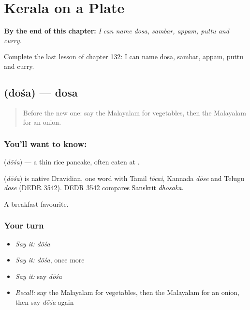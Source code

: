 
\chapter{Kerala on a Plate}
\label{ch:ml-kerala-on-a-plate}

\begin{chapteropening}
\textbf{By the end of this chapter:} \emph{I can name dosa, sambar, appam, puttu and curry.}

Complete the last lesson of chapter 132: I can name dosa, sambar, appam, puttu and curry.
\end{chapteropening}

\section[\texorpdfstring{\ml{ദോശ} (dōśa)}{ദോശ (dōśa)}]{ (dōśa) — dosa}

\label{lesson:ML-C132-dosa}



\begin{quote}
Before the new one: say the Malayalam for vegetables, then the Malayalam for an onion.
\end{quote}

\subsection*{You'll want to know: }
\textbf{} (\emph{dōśa}) — a thin rice pancake, often eaten at \textbf{}.

\begin{cousinweb}
\textbf{} (\emph{dōśa}) is native Dravidian, one word with Tamil \emph{tōcai}, Kannada \emph{dōse} and Telugu \emph{dōse} (DEDR 3542). DEDR 3542 compares Sanskrit \emph{dhosaka}.
\end{cousinweb}

\begin{grammarlens}[title={What you've built}]
A breakfast favourite.
\end{grammarlens}

\subsection*{Your turn}
\begin{itemize}
\raggedright
  \item \emph{Say it:} \emph{dōśa}
  \item \emph{Say it:} \emph{dōśa}, once more
  \item \emph{Say it:} say \emph{dōśa}
  \item \emph{Recall:} say the Malayalam for vegetables, then the Malayalam for an onion, then say \emph{dōśa} again
\end{itemize}

